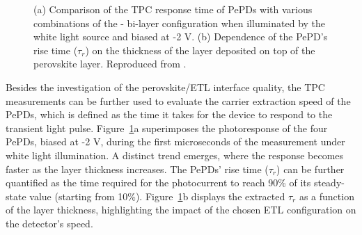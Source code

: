 \begin{figure}[ht!]
    \caption[Comparison of the TPC response time of PePDs with various combinations of the - bi-layer configuration and dependence of the PePD's rise time ($\tau_r$) on the thickness of the  layer.]{(a) Comparison of the TPC response time of PePDs with various combinations of the - bi-layer configuration when illuminated by the white light source and biased at -2 V. (b) Dependence of the PePD's rise time ($\tau_r$) on the thickness of the  layer deposited on top of the perovskite layer. Reproduced from \cite{Papadopoulou2025ElectronSpeed}.}
    \label{fig:etl_opt:rise_time}
\end{figure}

Besides the investigation of the perovskite/ETL interface quality, the TPC measurements can be further used to evaluate the carrier extraction speed of the PePDs, which is defined as the time it takes for the device to respond to the transient light pulse. Figure~\ref{fig:etl_opt:rise_time}a superimposes the photoresponse of the four PePDs, biased at -2 V, during the first microseconds of the measurement under white light illumination. A distinct trend emerges, where the response becomes faster as the  layer thickness increases. The PePDs' rise time ($\tau_r$) can be further quantified as the time required for the photocurrent to reach 90\% of its steady-state value (starting from 10\%). Figure~\ref{fig:etl_opt:rise_time}b displays the extracted $\tau_r$ as a function of the  layer thickness, highlighting the impact of the chosen ETL configuration on the detector's speed.  

